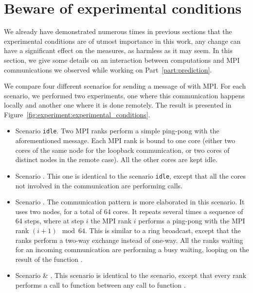     \section{Beware of experimental conditions}%
    \label{sec:beware_of_experimental_conditions}
        We already have demonstrated numerous times in previous sections that the experimental conditions are of utmost
        importance in this work, any change can have a significant effect on the measures, as harmless as it may seem.
        In this section, we give some details on an interaction between computations and MPI communications we observed
        while working on Part~\ref{part:prediction}.

        We compare four different scenarios for sending a message of  with MPI. For each scenario,
        we performed two experiments, one where this communication happens locally and another one where it is done
        remotely. The result is presented in Figure~\ref{fig:experiment:experimental_conditions}.
        \begin{itemize}
            \item Scenario \texttt{idle}. Two MPI ranks perform a simple ping-pong with the aforementioned message. Each
                MPI rank is bound to one core (either two cores of the same node for the loopback communication, or two
                cores of distinct nodes in the remote case). All the other cores are kept idle.
            \item Scenario \dgemm. This one is identical to the scenario \texttt{idle}, except that all the cores not
                involved in the communication are performing \dgemm calls.
            \item Scenario \iprobe. The communication pattern is more elaborated in this scenario. It uses
                two nodes, for a total of 64 cores. It repeats several times a sequence of 64 steps, where at step \(i\)
                the MPI rank \(i\) performs a ping-pong with the MPI rank \((i+1)\mod64\). This is similar to a ring
                broadcast, except that the ranks perform a two-way exchange instead of one-way. All the ranks waiting
                for an incoming communication are performing a busy waiting, looping on the result of the function
                \iprobe.
            \item Scenario \iprobe \& \dgemm. This scenario is identical to the \iprobe
                scenario, except that every rank performs a call to function \dgemm between any call to function
                \iprobe.
        \end{itemize}

